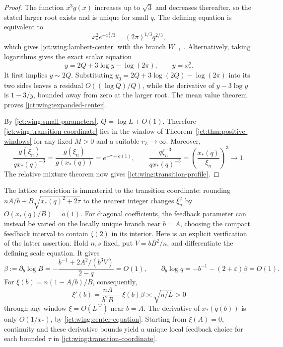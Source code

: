 \begin{proof}
The function $x^3g(x)$ increases up to $\sqrt3$ and decreases
thereafter, so the stated larger root exists and is unique for
small $q$.  The defining equation is equivalent to
\[
 x_*^2e^{-x_*^2/3}=(2\pi)^{1/3}q^{2/3},
\]
which gives \eqref{jct:wing:lambert-center} with the branch $W_{-1}$ \cite{lmi:lambert}.
Alternatively, taking logarithms gives the exact scalar equation
\begin{equation}\label{jct:wing:center-equation}
 y=2Q+3\log y-\log(2\pi),\qquad y=x_*^2.
\end{equation}
It first implies $y\sim2Q$.  Substituting
$y_0=2Q+3\log(2Q)-\log(2\pi)$ into its two sides leaves a
residual $O((\log Q)/Q)$, while the derivative of
$y-3\log y$ is $1-3/y$, bounded away from zero at the larger
root.  The mean value theorem proves
\eqref{jct:wing:expanded-center}.

By \eqref{jct:wing:small-parameters}, $Q=\log L+O(1)$.
Therefore \eqref{jct:wing:transition-coordinate} lies in the
window of Theorem~\ref{jct:thm:positive-windows} for any fixed $M>0$
and a suitable $r_L\to\infty$.  Moreover,
\[
 \frac{g(\xi_n)}{qx_*(q)^{-3}}
 =\frac{g(\xi_n)}{g(x_*(q))}
 =e^{-\tau+o(1)},\qquad
 \frac{q\xi_n^{-3}}{qx_*(q)^{-3}}
 =\left(\frac{x_*(q)}{\xi_n}\right)^3\longrightarrow1.
\]
The relative mixture theorem now gives
\eqref{jct:wing:transition-profile}.
\end{proof}

The lattice restriction is immaterial to the transition coordinate:
rounding $nA/b+B\sqrt{x_*(q)^2+2\tau}$ to the nearest
integer changes $\xi_n^2$ by $O(x_*(q)/B)=o(1)$.
For diagonal coefficients, the feedback parameter can instead be
varied on the locally unique branch near $b=A$, choosing the compact
feedback interval to contain $\zeta(2)$ in its interior.  Here is an explicit
verification of the latter assertion.  Hold $n,s$ fixed, put
$V=bB^2/n$, and differentiate the defining scale equation.  It gives
\[
 \beta:=\partial_b\log B
 =-\frac{b^{-1}+2A^2/(b^3V)}{2-q}=O(1),\qquad
 \partial_b\log q=-b^{-1}-(2+\varepsilon)\beta=O(1).
\]
For $\xi(b)=n(1-A/b)/B$, consequently,
\[
 \xi'(b)=\frac{nA}{b^2B}-\xi(b)\beta
                  \asymp\sqrt{n/L}>0
\]
through any window $\xi=O(L^M)$ near $b=A$.  The derivative of
$x_*(q(b))$ is only $O(1/x_*)$, by
\eqref{jct:wing:center-equation}.  Starting from $\xi(A)=0$,
continuity and these derivative bounds yield a unique local
feedback choice for each bounded $\tau$ in
\eqref{jct:wing:transition-coordinate}.

